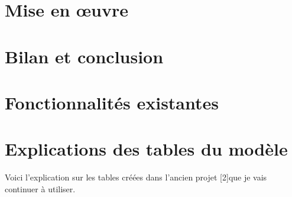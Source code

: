 \documentclass{polytech/polytech}
\begin{document}
\chapter{Mise en œuvre}


\chapter{Bilan et conclusion}


\appendix

\chapter{Fonctionnalités existantes}



\chapter{Explications des tables du modèle}



Voici l'explication sur les tables créées dans l'ancien projet [2]que je vais continuer à utiliser.
\end{document}
